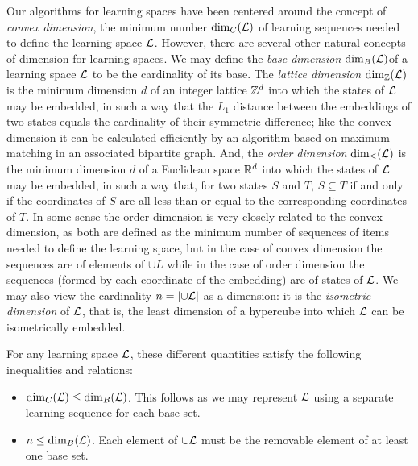 \documentclass[11pt]{llncs}
\def\Ree{\ensuremath{\Bbb R}}
\def\Zee{\ensuremath{\Bbb Z}}
\begin{document}
{Our algorithms for learning spaces have been centered around the concept of \emph{convex dimension}, the minimum number ${\rm dim}_C({\cal L})$ of learning sequences needed to define the learning space $\cal L$.
However, there are several other natural concepts of dimension for learning spaces.
We may define the \emph{base dimension} ${\rm dim}_B({\cal L})$of a learning space $\cal L$ to be the cardinality of its base.
The \emph{lattice dimension} ${\rm dim}_\Zee({\cal L})$ \citep{eppst05} is the minimum dimension $d$ of an integer lattice $\Zee^d$ into which the states of $\cal L$ may be embedded, in such a way that the $L_1$ distance between the embeddings of two states equals the cardinality of their symmetric difference; like the convex dimension it can be calculated efficiently by an algorithm based on maximum matching in an associated bipartite graph. And, the \emph{order dimension} ${\rm dim}_\le({\cal L})$
is the minimum dimension $d$ of a Euclidean space $\Ree^d$ into which the states of $\cal L$ may be embedded, in such a way that, for two states $S$ and $T$, $S\subseteq T$ if and only if the coordinates of $S$ are all less than or equal to the corresponding coordinates of $T$. In some sense the order dimension is very closely related to the convex dimension, as both are defined as the minimum number of sequences of items needed to define the learning space, but in the case of convex dimension the sequences are of elements of $\cup L$ while in the case of order dimension the sequences (formed by each coordinate of the embedding) are of states of $\cal L$. We may also view the cardinality $n=|{\cup\cal L}|$ as a dimension: it is the \emph{isometric dimension} of $\cal L$, that is, the least dimension of a hypercube into which $\cal L$ can be isometrically embedded.

For any learning space $\cal L$, these different quantities satisfy the following inequalities and relations:

\begin{itemize}
\item ${\rm dim}_C({\cal L})\le{\rm dim}_B({\cal L})$. This follows as we may represent $\cal L$ using a separate learning sequence for each base set.

\item $n\le{\rm dim}_B({\cal L})$. Each element of $\cup\cal L$ must be the removable element of at least one base set.


\end{itemize}}
\end{document}
